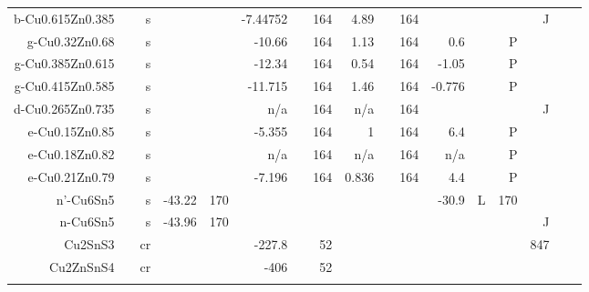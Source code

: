 \begin{table}[htbp]
\begin{adjustbox}{width=1\textwidth}
\begin{tabular}{rrrrrrrrrrrrrrrrr}
    b-Cu0.615Zn0.385 &       & s     &       &       & -7.44752 &       & 164   & 4.89  &       & 164   &       &       &       & J     &       &  \\
    g-Cu0.32Zn0.68 &       & s     &       &       & -10.66 &       & 164   & 1.13  &       & 164   & 0.6   &       & P     &       &       &  \\
    g-Cu0.385Zn0.615 &       & s     &       &       & -12.34 &       & 164   & 0.54  &       & 164   & -1.05 &       & P     &       &       &  \\
    g-Cu0.415Zn0.585 &       & s     &       &       & -11.715 &       & 164   & 1.46  &       & 164   & -0.776 &       & P     &       &       &  \\
    d-Cu0.265Zn0.735 &       & s     &       &       & n/a   &       & 164   & n/a   &       & 164   &       &       &       & J     &       &  \\
    e-Cu0.15Zn0.85 &       & s     &       &       & -5.355 &       & 164   & 1     &       & 164   & 6.4   &       & P     &       &       &  \\
    e-Cu0.18Zn0.82 &       & s     &       &       & n/a   &       & 164   & n/a   &       & 164   & n/a   &       & P     &       &       &  \\
    e-Cu0.21Zn0.79 &       & s     &       &       & -7.196 &       & 164   & 0.836 &       & 164   & 4.4   &       & P     &       &       &  \\
    n'-Cu6Sn5 &       & s     & -43.22 & 170   &       &       &       &       &       &       & -30.9 & L     & 170   &       &       &  \\
    n-Cu6Sn5 &       & s     & -43.96 & 170   &       &       &       &       &       &       &       &       &       & J     &       &  \\
    Cu2SnS3 &       & cr    &       &       & -227.8 &       & 52    &       &       &       &       &       &       & 847   &       &  \\
    Cu2ZnSnS4 &       & cr    &       &       & -406  &       & 52    &       &       &       &       &       &       &       &       &  \\
          &       &       &       &       &       &       &       &       &       &       &       &       &       &       &       &  \\
    \bottomrule
    \end{tabular}%
    \end{adjustbox}
  \label{tab:addlabel}%
\end{table}%
